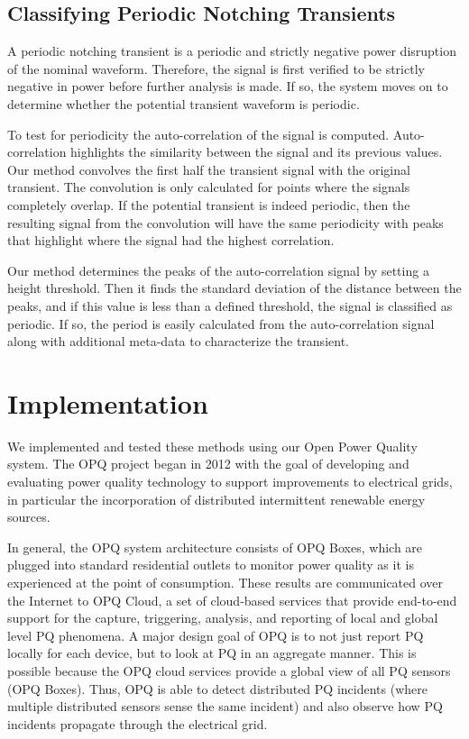 \documentclass[10pt, conference, compsocconf]{IEEEtran}
\begin{document}
\subsection{Classifying Periodic Notching Transients}

A periodic notching transient is a periodic and strictly negative power disruption of the nominal waveform. Therefore, the signal is first verified to be strictly negative in power before further analysis is made. If so, the system moves on to determine whether the potential transient waveform is periodic.

To test for periodicity the auto-correlation of the signal is computed. Auto-correlation highlights the similarity between the signal and its previous values. Our method convolves the first half the transient signal with the original transient. The convolution is only calculated for points where the signals completely overlap. If the potential transient is indeed periodic, then the resulting signal from the convolution will have the same periodicity with peaks that highlight where the signal had the highest correlation.

Our method determines the peaks of the auto-correlation signal by setting a height threshold. Then it finds the standard deviation of the distance between the peaks, and if this value is less than a defined threshold, the signal is classified as periodic. If so, the period is easily calculated from the auto-correlation signal along with additional meta-data to characterize the transient.

\section{Implementation}
\label{sec:Implementation}

We implemented and tested these methods using our Open Power Quality system.  The OPQ project began in 2012 with the goal of developing and evaluating power quality technology to support improvements to electrical grids, in particular the incorporation of distributed intermittent renewable energy sources.

In general, the OPQ system architecture consists of OPQ Boxes, which are plugged into standard residential outlets to monitor power quality as it is experienced at the point of consumption.  These results are communicated over the Internet to OPQ Cloud, a set of cloud-based services that provide end-to-end support for the capture, triggering, analysis, and reporting of local and global level PQ phenomena. A major design goal of OPQ is to not just report PQ locally for each device, but to look at PQ in an aggregate manner. This is possible because the OPQ cloud services provide a global view of all PQ sensors (OPQ Boxes). Thus, OPQ is able to detect distributed PQ incidents (where multiple distributed sensors sense the same incident) and also observe how PQ incidents propagate through the electrical grid.
\end{document}
